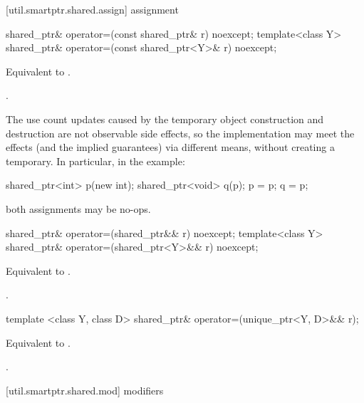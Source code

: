 [util.smartptr.shared.assign]{ assignment}

%
\begin{itemdecl}
shared_ptr& operator=(const shared_ptr& r) noexcept;
template<class Y> shared_ptr& operator=(const shared_ptr<Y>& r) noexcept;
\end{itemdecl}

\begin{itemdescr}
\pnum\effects  Equivalent to .

\pnum\returns  {}.

\pnum \begin{note}
The use count updates caused by the temporary object
construction and destruction are not observable side
effects, so the implementation may meet the effects (and the
implied guarantees) via different means, without creating a
temporary. In particular, in the example:
\begin{codeblock}
shared_ptr<int> p(new int);
shared_ptr<void> q(p);
p = p;
q = p;
\end{codeblock}
both assignments may be no-ops. \end{note}
\end{itemdescr}

%
\begin{itemdecl}
shared_ptr& operator=(shared_ptr&& r) noexcept;
template<class Y> shared_ptr& operator=(shared_ptr<Y>&& r) noexcept;
\end{itemdecl}

\begin{itemdescr}
\pnum
\effects Equivalent to .

\pnum
\returns {}.
\end{itemdescr}

%
\begin{itemdecl}
template <class Y, class D> shared_ptr& operator=(unique_ptr<Y, D>&& r);
\end{itemdecl}

\begin{itemdescr}
\pnum
\effects Equivalent to .

\pnum
\returns {}.
\end{itemdescr}



[util.smartptr.shared.mod]{ modifiers}

